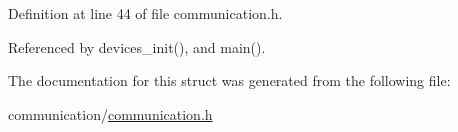 Definition at line 44 of file communication.\-h.



Referenced by devices\-\_\-init(), and main().



The documentation for this struct was generated from the following file\-:\begin{DoxyCompactItemize}
\item 
communication/\hyperlink{communication_2communication_8h}{communication.\-h}\end{DoxyCompactItemize}
